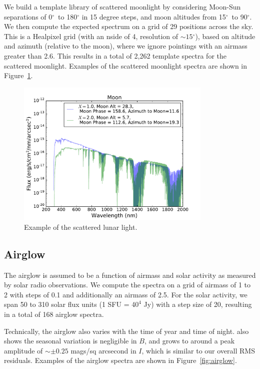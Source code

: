\documentclass[]{spie}
\newcommand\degree{{^\circ}}
\begin{document}
We build a template library of scattered moonlight by considering Moon-Sun separations of 0$\degree$\ to 180$\degree$ in 15 degree steps, and moon altitudes from 15$\degree$\ to 90$\degree$.  We then compute the expected spectrum on a grid of 29 positions across the sky. This is a Healpixel grid (with an nside of 4, resolution of $\sim15\degree$), based on altitude and azimuth (relative to the moon), where we ignore pointings with an airmass greater than 2.6. This results in a total of 2,262 template spectra for the scattered moonlight. Examples of the scattered moonlight spectra are shown in Figure~\ref{fig:moon}.

\begin{figure}[ht]
  \begin{center}
  \includegraphics[height=7cm]{plots/moon.pdf}
  \end{center}
  \caption{Example of the scattered lunar light. \label{fig:moon}}
\end{figure}


\subsection{Airglow}

The airglow is assumed to be a function of airmass and solar activity as measured by solar radio observations.  We compute the spectra on a grid of airmass of 1 to 2 with steps of 0.1 and additionally an airmass of 2.5.  For the solar activity, we span 50 to 310 solar flux units (1 SFU = 4$0^4$ Jy) with a step size of 20, resulting in a total of 168 airglow spectra. 

Technically, the airglow also varies with the time of year and time of night.  also shows the seasonal variation is negligible in $B$, and grows to around a peak amplitude of $\sim\pm0.25$ mags/sq arcsecond in $I$, which is similar to our overall RMS residuals. Examples of the airglow spectra are shown in Figure~\ref{fig:airglow}. 
\end{document}
